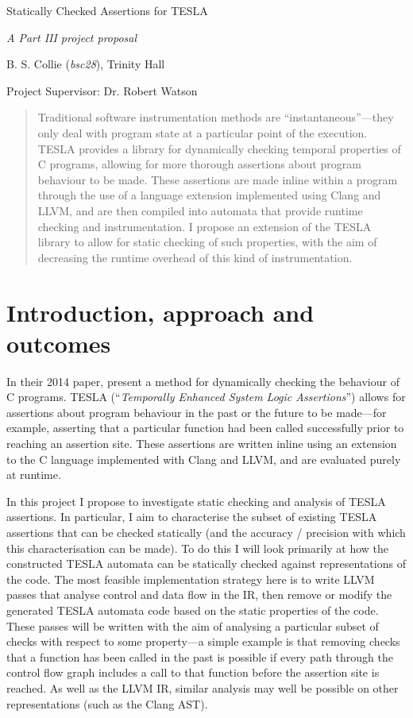 \documentclass[11pt]{article}
\begin{document}
\centerline{\Large Statically Checked Assertions for TESLA}
\vspace{2em}
\centerline{\Large \emph{A Part III project proposal}}
\vspace{2em}
\centerline{\large B. S. Collie (\emph{bsc28}), Trinity Hall}
\vspace{1em}
\centerline{\large Project Supervisor: Dr. Robert Watson}
\vspace{1em}

\begin{abstract}
  Traditional software instrumentation methods are ``instantaneous''---they only deal with
  program state at a particular point of the execution. TESLA \cite{anderson_tesla:_2014}
  provides a library for dynamically checking temporal properties of C programs, allowing
  for more thorough assertions about program behaviour to be made. These assertions are
  made inline within a program through the use of a language extension implemented using
  Clang and LLVM, and are then compiled into automata that provide runtime checking and
  instrumentation. I propose an extension of the TESLA library to allow for static
  checking of such properties, with the aim of decreasing the runtime overhead of this
  kind of instrumentation.
\end{abstract}

\section{Introduction, approach and outcomes}

In their 2014 paper, \textcite{anderson_tesla:_2014} present a method for dynamically
checking the behaviour of C programs. TESLA (``\textit{Temporally Enhanced System Logic
Assertions}'') allows for assertions about program behaviour in the past or the future to
be made---for example, asserting that a particular function had been called successfully
prior to reaching an assertion site. These assertions are written inline using an
extension to the C language implemented with Clang and LLVM, and are evaluated purely at
runtime.

In this project I propose to investigate static checking and analysis of TESLA assertions.
In particular, I aim to characterise the subset of existing TESLA assertions that can be
checked statically (and the accuracy / precision with which this characterisation can be
made). To do this I will look primarily at how the constructed TESLA automata can be
statically checked against representations of the code. The most feasible implementation
strategy here is to write LLVM passes that analyse control and data flow in the IR, then
remove or modify the generated TESLA automata code based on the static properties of the
code. These passes will be written with the aim of analysing a particular subset of checks
with respect to some property---a simple example is that removing checks that a function
has been called in the past is possible if every path through the control flow graph
includes a call to that function before the assertion site is reached. As well as the LLVM
IR, similar analysis may well be possible on other representations (such as the Clang
AST).
\end{document}
